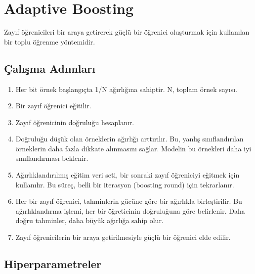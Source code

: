 \section{Adaptive Boosting}
Zayıf öğrenicileri bir araya getirerek güçlü bir öğrenici oluşturmak için kullanılan bir toplu öğrenme yöntemidir.

\subsection{Çalışma Adımları}
\begin{enumerate}
    \item Her bit örnek başlangıçta 1/N ağırlığına sahiptir. N, toplam örnek sayısı.
    \item Bir zayıf öğrenici eğitilir.
    \item Zayıf öğrenicinin doğruluğu hesaplanır.
    \item Doğruluğu düşük olan örneklerin ağırlığı arttırılır. Bu, yanlış sınıflandırılan örneklerin daha fazla dikkate alınmasını sağlar. Modelin bu örnekleri daha iyi sınıflandırması beklenir.
    \item Ağırlıklandırılmış eğitim veri seti, bir sonraki zayıf öğreniciyi eğitmek için kullanılır. Bu süreç, belli bir iterasyon (boosting round) için tekrarlanır.
    \item Her bir zayıf öğrenici, tahminlerin gücüne göre bir ağırlıkla birleştirilir. Bu ağırlıklandırma işlemi, her bir öğreticinin doğruluğuna göre belirlenir. Daha doğru tahminler, daha büyük ağırlığa sahip olur.
    \item Zayıf öğrenicilerin bir araya getirilmesiyle güçlü bir öğrenici elde edilir.
\end{enumerate}

\subsection{Hiperparametreler}

\begin{table}[h]
\centering
{\scriptsize\renewcommand{\arraystretch}{0.4}
{}}
\end{table}

\newpage